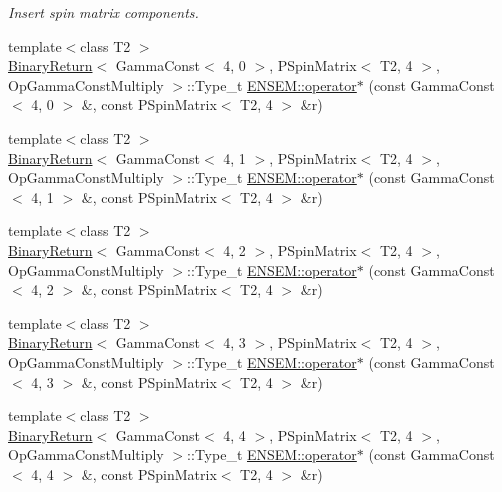 \begin{DoxyCompactItemize}
\begin{DoxyCompactList}\small\item\em Insert spin matrix components. \end{DoxyCompactList}\item 
{\footnotesize template$<$class T2 $>$ }\\\mbox{\hyperlink{structBinaryReturn}{Binary\+Return}}$<$ Gamma\+Const$<$ 4, 0 $>$, P\+Spin\+Matrix$<$ T2, 4 $>$, Op\+Gamma\+Const\+Multiply $>$\+::Type\+\_\+t \mbox{\hyperlink{group__primspinmatrix_ga3c278ae3c7e7dc6db3a144f463999af2}{E\+N\+S\+E\+M\+::operator$\ast$}} (const Gamma\+Const$<$ 4, 0 $>$ \&, const P\+Spin\+Matrix$<$ T2, 4 $>$ \&r)
\item 
{\footnotesize template$<$class T2 $>$ }\\\mbox{\hyperlink{structBinaryReturn}{Binary\+Return}}$<$ Gamma\+Const$<$ 4, 1 $>$, P\+Spin\+Matrix$<$ T2, 4 $>$, Op\+Gamma\+Const\+Multiply $>$\+::Type\+\_\+t \mbox{\hyperlink{group__primspinmatrix_gafa6af9df04bb90ce7675e5c8f4b13ac8}{E\+N\+S\+E\+M\+::operator$\ast$}} (const Gamma\+Const$<$ 4, 1 $>$ \&, const P\+Spin\+Matrix$<$ T2, 4 $>$ \&r)
\item 
{\footnotesize template$<$class T2 $>$ }\\\mbox{\hyperlink{structBinaryReturn}{Binary\+Return}}$<$ Gamma\+Const$<$ 4, 2 $>$, P\+Spin\+Matrix$<$ T2, 4 $>$, Op\+Gamma\+Const\+Multiply $>$\+::Type\+\_\+t \mbox{\hyperlink{group__primspinmatrix_ga55de5be902e508670e59d7c11c319618}{E\+N\+S\+E\+M\+::operator$\ast$}} (const Gamma\+Const$<$ 4, 2 $>$ \&, const P\+Spin\+Matrix$<$ T2, 4 $>$ \&r)
\item 
{\footnotesize template$<$class T2 $>$ }\\\mbox{\hyperlink{structBinaryReturn}{Binary\+Return}}$<$ Gamma\+Const$<$ 4, 3 $>$, P\+Spin\+Matrix$<$ T2, 4 $>$, Op\+Gamma\+Const\+Multiply $>$\+::Type\+\_\+t \mbox{\hyperlink{group__primspinmatrix_gaeffd66ff58d2cd7122d34c77e7109255}{E\+N\+S\+E\+M\+::operator$\ast$}} (const Gamma\+Const$<$ 4, 3 $>$ \&, const P\+Spin\+Matrix$<$ T2, 4 $>$ \&r)
\item 
{\footnotesize template$<$class T2 $>$ }\\\mbox{\hyperlink{structBinaryReturn}{Binary\+Return}}$<$ Gamma\+Const$<$ 4, 4 $>$, P\+Spin\+Matrix$<$ T2, 4 $>$, Op\+Gamma\+Const\+Multiply $>$\+::Type\+\_\+t \mbox{\hyperlink{group__primspinmatrix_gabc287f892d11c49158f8022c393a8516}{E\+N\+S\+E\+M\+::operator$\ast$}} (const Gamma\+Const$<$ 4, 4 $>$ \&, const P\+Spin\+Matrix$<$ T2, 4 $>$ \&r)
\item 

\end{DoxyCompactItemize}
